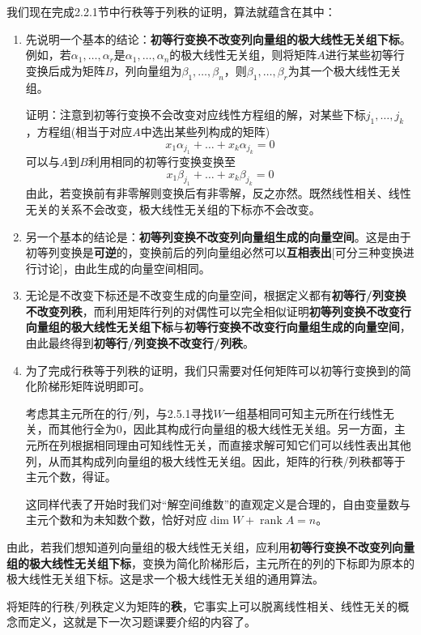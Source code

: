 \documentclass[a4paper,UTF8,fontset=windows]{ctexart}
\DeclareMathOperator{\rank}{rank}
\newcommand*{\note}{\noindent *}
\begin{document}
我们现在完成2.2.1节中行秩等于列秩的证明，算法就蕴含在其中：
\begin{enumerate}
    \item 先说明一个基本的结论：\textbf{初等行变换不改变列向量组的极大线性无关组下标}。例如，若$\alpha_1,\dots,\alpha_r$是$\alpha_1,\dots,\alpha_n$的极大线性无关组，则将矩阵$A$进行某些初等行变换后成为矩阵$B$，列向量组为$\beta_1,\dots,\beta_n$，则$\beta_1,\dots,\beta_r$为其一个极大线性无关组。

    证明：注意到初等行变换不会改变对应线性方程组的解，对某些下标$j_1,\dots,j_k$，方程组(相当于对应$A$中选出某些列构成的矩阵)
    $$x_1\alpha_{j_1}+\dots+x_k\alpha_{j_k}=0$$
    可以与$A$到$B$利用相同的初等行变换变换至
    $$x_1\beta_{j_1}+\dots+x_k\beta_{j_k}=0$$
    由此，若变换前有非零解则变换后有非零解，反之亦然。既然线性相关、线性无关的关系不会改变，极大线性无关组的下标亦不会改变。

    \item 另一个基本的结论是：\textbf{初等列变换不改变列向量组生成的向量空间}。这是由于初等列变换是\textbf{可逆}的，变换前后的列向量组必然可以\textbf{互相表出}[可分三种变换进行讨论]，由此生成的向量空间相同。
    
    \item 无论是不改变下标还是不改变生成的向量空间，根据定义都有\textbf{初等行/列变换不改变列秩}，而利用矩阵行列的对偶性可以完全相似证明\textbf{初等列变换不改变行向量组的极大线性无关组下标}与\textbf{初等行变换不改变行向量组生成的向量空间}，由此最终得到\textbf{初等行/列变换不改变行/列秩}。
    
    \item 为了完成行秩等于列秩的证明，我们只需要对任何矩阵可以初等行变换到的简化阶梯形矩阵说明即可。
    
    考虑其主元所在的行/列，与2.5.1寻找$W$一组基相同可知主元所在行线性无关，而其他行全为0，因此其构成行向量组的极大线性无关组。另一方面，主元所在列根据相同理由可知线性无关，而直接求解可知它们可以线性表出其他列，从而其构成列向量组的极大线性无关组。因此，矩阵的行秩/列秩都等于主元个数，得证。

    \note 这同样代表了开始时我们对``解空间维数''的直观定义是合理的，自由变量数与主元个数和为未知数个数，恰好对应$\dim W+\rank A=n$。
\end{enumerate}

由此，若我们想知道列向量组的极大线性无关组，应利用\textbf{初等行变换不改变列向量组的极大线性无关组下标}，变换为简化阶梯形后，主元所在的列的下标即为原本的极大线性无关组下标。这是求一个极大线性无关组的通用算法。

\note 将矩阵的行秩/列秩定义为矩阵的\textbf{秩}，它事实上可以脱离线性相关、线性无关的概念而定义，这就是下一次习题课要介绍的内容了。
\end{document}
